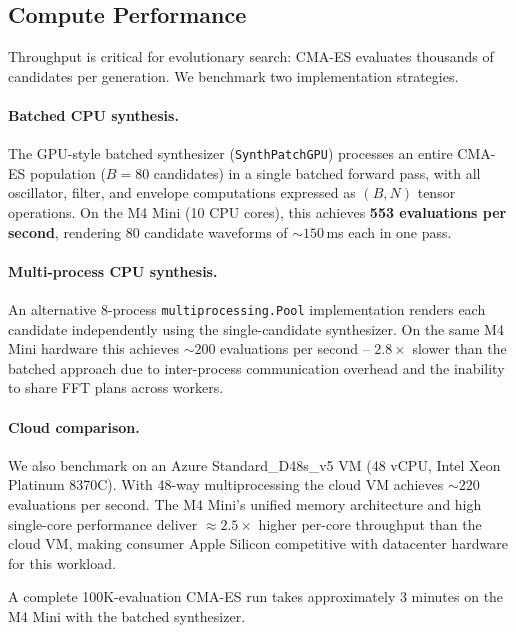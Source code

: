 \subsection{Compute Performance}
\label{sec:compute}

Throughput is critical for evolutionary search: CMA-ES evaluates thousands of candidates per generation.
We benchmark two implementation strategies.

\paragraph{Batched CPU synthesis.}
The GPU-style batched synthesizer (\texttt{SynthPatchGPU}) processes an entire CMA-ES population ($B = 80$ candidates) in a single batched forward pass, with all oscillator, filter, and envelope computations expressed as $(B, N)$ tensor operations.
On the M4 Mini (10 CPU cores), this achieves \textbf{553 evaluations per second}, rendering 80 candidate waveforms of ${\sim}150$\,ms each in one pass.

\paragraph{Multi-process CPU synthesis.}
An alternative 8-process \texttt{multiprocessing.Pool} implementation renders each candidate independently using the single-candidate synthesizer.
On the same M4 Mini hardware this achieves ${\sim}200$ evaluations per second -- $2.8\times$ slower than the batched approach due to inter-process communication overhead and the inability to share FFT plans across workers.

\paragraph{Cloud comparison.}
We also benchmark on an Azure Standard\_D48s\_v5 VM (48 vCPU, Intel Xeon Platinum 8370C).
With 48-way multiprocessing the cloud VM achieves ${\sim}220$ evaluations per second.
The M4 Mini's unified memory architecture and high single-core performance deliver ${\approx}2.5\times$ higher per-core throughput than the cloud VM, making consumer Apple Silicon competitive with datacenter hardware for this workload.

A complete 100K-evaluation CMA-ES run takes approximately 3 minutes on the M4 Mini with the batched synthesizer.
